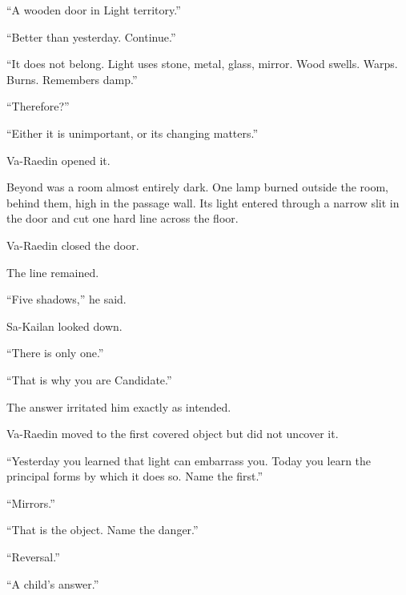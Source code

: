 “A wooden door in Light territory.”\par

“Better than yesterday.
Continue.”\par

“It does not belong.
Light uses stone, metal, glass, mirror.
Wood swells.
Warps.
Burns.
Remembers damp.”\par

“Therefore?”\par

“Either it is unimportant, or its changing matters.”\par

Va-Raedin opened it.\par

Beyond was a room almost entirely dark.
One lamp burned outside the room, behind them, high in the passage wall.
Its light entered through a narrow slit in the door and cut one hard line across the floor.\par

Va-Raedin closed the door.\par

The line remained.\par

“Five shadows,” he said.\par

Sa-Kailan looked down.\par

“There is only one.”\par

“That is why you are Candidate.”\par

The answer irritated him exactly as intended.\par

Va-Raedin moved to the first covered object but did not uncover it.\par

“Yesterday you learned that light can embarrass you.
Today you learn the principal forms by which it does so.
Name the first.”\par

“Mirrors.”\par

“That is the object.
Name the danger.”\par

“Reversal.”\par

“A child’s answer.”\par


